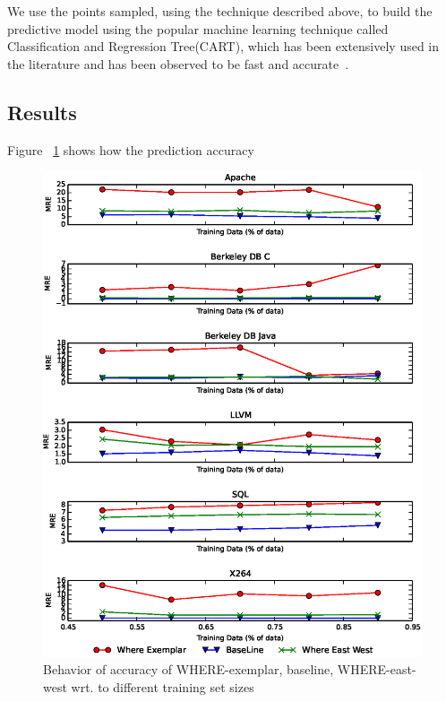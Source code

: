\documentclass{sig-alternative}
\begin{document}
We use the points sampled, using the technique described above, to build the predictive model using the popular machine learning technique called Classification and Regression Tree(CART), which has been extensively used in the literature and has been observed to be fast and accurate~\cite{guo2013variability}.

\subsection{Results}


Figure ~\ref{fig:sampling_accuracy} shows how the prediction accuracy
\begin{figure}[!t]
\includegraphics[width=0.9\linewidth]{Figures/SamplingAccuracy.eps}
\caption{Behavior of accuracy of WHERE-exemplar, baseline, WHERE-east-west wrt. to different training set sizes }\label{fig:sampling_accuracy}
\end{figure}
\end{document}
